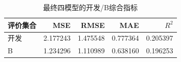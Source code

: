 \begin{table}[htbp]
\small
\setlength{\tabcolsep}{5pt}
\centering
\caption{最终四模型的开发/B综合指标}
\label{tab:final-metrics}
\begin{tabular}{lrrrr}
\toprule
评价集合 & MSE & RMSE & MAE & $R^2$ \\
\midrule
开发 & 2.177243 & 1.475548 & 0.777364 & 0.205397 \\
B & 1.234296 & 1.110989 & 0.638160 & 0.196253 \\
\bottomrule
\end{tabular}
\end{table}
